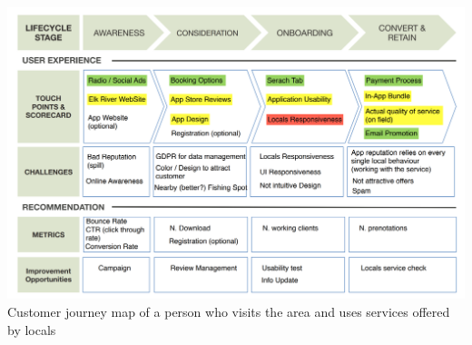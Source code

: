 \centering
\includegraphics[width=1.0\textwidth]{Img/Customer_journey_map}
Customer journey map of a person who visits the area and uses services offered by locals
